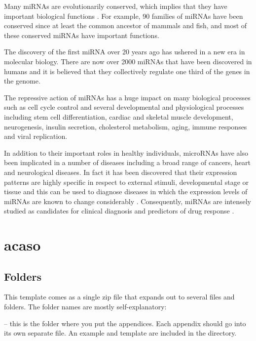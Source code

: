 Many miRNAs are evolutionarily conserved, which implies that they have important biological functions \cite{conserved_pairing}. For example, 90 families of miRNAs have been conserved since at least the common ancestor of mammals and fish, and most of these conserved miRNAs have important functions.

The discovery of the first miRNA over 20 years ago has ushered in a new era in molecular biology. There are now over 2000 miRNAs that have been discovered in humans and it is believed that they collectively regulate one third of the genes in the genome.

The repressive action of miRNAs has a huge impact on many biological processes such as cell cycle control and several developmental and physiological processes including stem cell differentiation, cardiac and skeletal muscle development, neurogenesis, insulin secretion, cholesterol metabolism, aging, immune responses and viral replication. \cite{mirna_annotation}

In addition to their important roles in healthy individuals, microRNAs have also been implicated in a number of diseases including a broad range of cancers, heart and neurological diseases.  In fact it has been discovered that their expression patterns  are highly specific in respect to external stimuli, developmental stage or tissue and this can be used to diagnose diseases in which the expression levels of miRNAs are known to change considerably \cite{computational_methods}. Consequently, miRNAs are intensely studied as candidates for clinical diagnosis and predictors of drug response \cite{mirna_diseases}.






\section{acaso}

\subsection{Folders}

This template comes as a single zip file that expands out to several files and folders. The folder names are mostly self-explanatory:

 -- this is the folder where you put the appendices. Each appendix should go into its own separate  file. An example and template are included in the directory.

